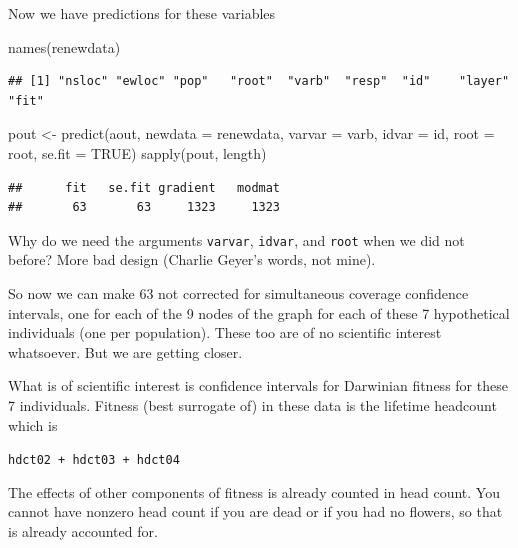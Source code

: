 \documentclass[
  ignorenonframetext,
]{beamer}
\newenvironment{Shaded}{\begin{snugshade}}{\end{snugshade}}
\newcommand{\AttributeTok}[1]{\textcolor[rgb]{0.77,0.63,0.00}{#1}}
\newcommand{\ConstantTok}[1]{\textcolor[rgb]{0.00,0.00,0.00}{#1}}
\newcommand{\FunctionTok}[1]{\textcolor[rgb]{0.00,0.00,0.00}{#1}}
\newcommand{\NormalTok}[1]{#1}
\newcommand{\OtherTok}[1]{\textcolor[rgb]{0.56,0.35,0.01}{#1}}
\begin{document}
\begin{frame}[fragile]{}
\protect\hypertarget{section-32}{}
Now we have predictions for these variables

\vspace{12pt}
\tiny

\begin{Shaded}
\begin{Highlighting}[]
\FunctionTok{names}\NormalTok{(renewdata)}
\end{Highlighting}
\end{Shaded}

\begin{verbatim}
## [1] "nsloc" "ewloc" "pop"   "root"  "varb"  "resp"  "id"    "layer" "fit"
\end{verbatim}

\begin{Shaded}
\begin{Highlighting}[]
\NormalTok{pout }\OtherTok{\textless{}{-}} \FunctionTok{predict}\NormalTok{(aout, }\AttributeTok{newdata =}\NormalTok{ renewdata, }\AttributeTok{varvar =}\NormalTok{ varb, }
  \AttributeTok{idvar =}\NormalTok{ id, }\AttributeTok{root =}\NormalTok{ root, }\AttributeTok{se.fit =} \ConstantTok{TRUE}\NormalTok{)}
\FunctionTok{sapply}\NormalTok{(pout, length)}
\end{Highlighting}
\end{Shaded}

\begin{verbatim}
##      fit   se.fit gradient   modmat 
##       63       63     1323     1323
\end{verbatim}

\vspace{12pt}
\normalsize

Why do we need the arguments \texttt{varvar}, \texttt{idvar}, and
\texttt{root} when we did not before? More bad design (Charlie Geyer's
words, not mine).
\end{frame}

\begin{frame}{}
\protect\hypertarget{section-33}{}
So now we can make 63 not corrected for simultaneous coverage confidence
intervals, one for each of the 9 nodes of the graph for each of these 7
hypothetical individuals (one per population). These too are of no
scientific interest whatsoever. But we are getting closer.

What is of scientific interest is confidence intervals for Darwinian
fitness for these 7 individuals. Fitness (best surrogate of) in these
data is the lifetime headcount which is

\begin{center}
  \texttt{hdct02 + hdct03 + hdct04}
\end{center}

The effects of other components of fitness is already counted in head
count. You cannot have nonzero head count if you are dead or if you had
no flowers, so that is already accounted for.
\end{frame}
\end{document}
